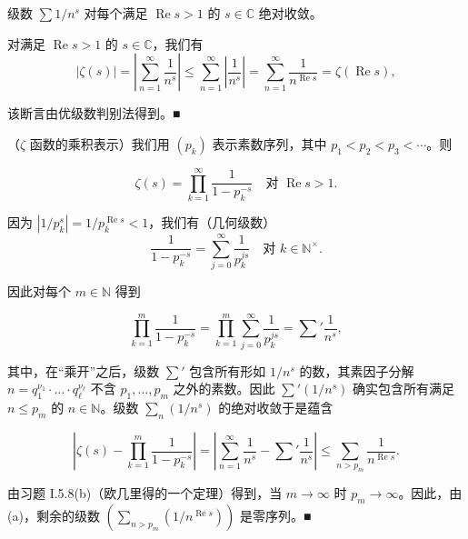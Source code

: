 \begin{remark}

\begin{items}
\item

级数 $ \sum 1/n^s $ 对每个满足 $ \operatorname{Re} s > 1 $ 的 $ s \in \mathbb{C} $ 绝对收敛。

\proofhead
对满足 $ \operatorname{Re} s > 1 $ 的 $ s \in \mathbb{C} $，我们有
\[
\left|\zeta(s)\right| = \left|\sum_{n=1}^{\infty}\frac{1}{n^s}\right| \le \sum_{n=1}^{\infty}\left|\frac{1}{n^s}\right| = \sum_{n=1}^{\infty}\frac{1}{n^{\operatorname{Re} s}} = \zeta(\operatorname{Re} s) ,
\]

该断言由优级数判别法得到。\nobreak\hspace{0.35em}■

\item

（$ \zeta $ 函数的乘积表示）我们用 $ (p_k) $ 表示素数序列，其中 $ p_1 < p_2 < p_3 < \cdots $。则

\[
\zeta(s) = \prod_{k=1}^{\infty}\frac{1}{1 - p_k^{-s}} \quad \text{对 } \operatorname{Re} s > 1 .
\]

\proofhead
因为 $ \left|1/p_k^s\right| = 1/p_k^{\operatorname{Re} s} < 1 $，我们有（几何级数）
\[
\frac{1}{1 - p_k^{-s}} = \sum_{j=0}^{\infty}\frac{1}{p_k^{js}} \quad \text{对 } k \in \mathbb{N}^\times .
\]

因此对每个 $ m \in \mathbb{N} $ 得到

\[
\prod_{k=1}^{m}\frac{1}{1 - p_k^{-s}} = \prod_{k=1}^{m}\sum_{j=0}^{\infty}\frac{1}{p_k^{js}} = {\sum}'\frac{1}{n^s} ,
\]

其中，在“乘开”之后，级数 $ {\sum}' $ 包含所有形如 $ 1/n^s $ 的数，其素因子分解 $ n = q_1^{\nu_1}\cdot\ldots\cdot q_\ell^{\nu_\ell} $ 不含 $ p_1, \ldots, p_m $ 之外的素数。因此 $ {\sum}'(1/n^s) $ 确实包含所有满足 $ n \le p_m $ 的 $ n \in \mathbb{N} $。级数 $ \sum_n (1/n^s) $ 的绝对收敛于是蕴含

\[
\left|\zeta(s) - \prod_{k=1}^{m}\frac{1}{1 - p_k^{-s}}\right| = \left|\sum_{n=1}^{\infty}\frac{1}{n^s} - {\sum}'\frac{1}{n^s}\right| \le \sum_{n > p_m}\frac{1}{n^{\operatorname{Re} s}} .
\]

由习题 I.5.8(b)（欧几里得的一个定理）得到，当 $ m \to \infty $ 时 $ p_m \to \infty $。因此，由 (a)，剩余的级数 $ \left(\sum_{n > p_m}(1/n^{\operatorname{Re} s})\right) $ 是零序列。\nobreak\hspace{0.35em}■

\item


\end{items}
\end{remark}
